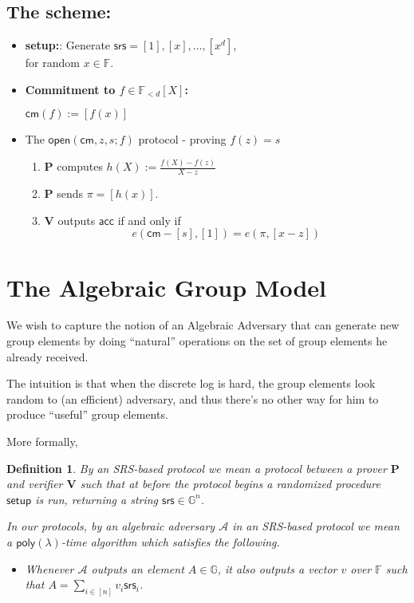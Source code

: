 \documentclass[11pt]{article} %
\newcommand{\G}{\ensuremath{{\mathbb G}}\xspace}
\newcommand{\F}{\ensuremath{\mathbb F}\xspace}
\newcommand{\adv}{\ensuremath{\mathcal A}\xspace}
\newcommand{\srs}{\ensuremath{\mathsf{srs}}\xspace}
\newcommand{\setup}{\ensuremath{\mathsf{setup}}\xspace}
\newcommand{\cm}{\ensuremath{\mathsf{cm}}\xspace}
\newcommand{\open}{\ensuremath{\mathsf{open}}\xspace}
\newcommand{\acc}{\ensuremath{\mathsf{acc}}\xspace}
\newcommand{\defeq}{:=}
\newcommand{\enc}[1]{\ensuremath{\left[#1\right]}\xspace}
\newcommand{\prv}{\ensuremath{\mathsf{\mathbf{P}}}\xspace}
\newcommand{\prf}{\ensuremath{\pi}\xspace}
\newcommand{\ver}{\ensuremath{\mathsf{\mathbf{V}}}\xspace}
\newcommand{\polysofdeg}[1]{\ensuremath{\F_{< #1}[X]}\xspace}
\newtheorem{dfn}[lemma]{Definition}
\newcommand{\poly}{\ensuremath{\mathsf{poly(\lambda)}}\xspace}
\begin{document}
\subsection{The scheme:}
\begin{itemize}
 \item 
 \textbf{setup:}: Generate $\srs= \enc{1},\enc{x},\ldots,\enc{x^d}$,\\
 for random $x\in \F$.
 \item\textbf{Commitment to $f\in\polysofdeg{d}$:}


 $\cm(f)\defeq   \enc{f(x)}$\\
 \item The $\open(\cm,z,s;f)$ protocol  - proving $f(z)=s$ 
\begin{enumerate}
 \item \prv computes 
 $h(X)\defeq \frac{f(X)-f(z)}{X-z}$\\
 \item \prv sends $\prf=[h(x)]$.
 \item \ver outputs \acc if and only if 
\[e(\cm-\enc{s},\enc{1}) = e(\prf, \enc{x-z})\]
\end{enumerate}
\end{itemize}

\section{The Algebraic Group Model}
We wish to capture the notion of an Algebraic Adversary that can generate new group elements by doing ``natural'' operations on the set
of group elements he already received.

The intuition is that when the discrete log is hard, the group elements look random to (an efficient) adversary, and thus there's no other way for him
to produce ``useful'' group elements.


More formally,
\begin{dfn}
 By an \emph{SRS-based protocol} we mean a protocol between a prover \prv and verifier \ver such that at
 before the protocol begins a randomized procedure \setup is run, returning a string $\srs \in \G^n$.

In our protocols, by an \emph{algebraic adversary} \adv in an SRS-based protocol we mean a \poly-time algorithm which satisfies the following.
\begin{itemize}
 \item Whenever \adv outputs an element $A\in \G$, it also outputs a vector $v$ over \F such that $A = \sum_{i\in [n]}v_i \srs _i$.
\end{itemize}
\end{dfn}
\end{document}
